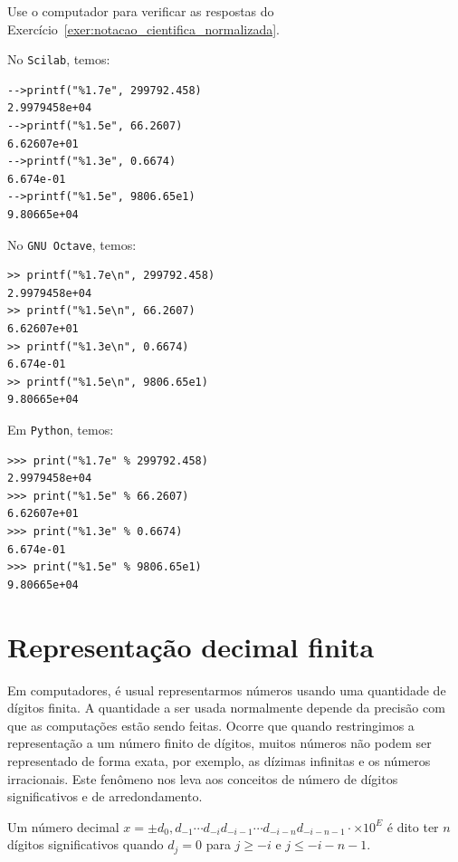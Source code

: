 \begin{exer}
  Use o computador para verificar as respostas do Exercício~\ref{exer:notacao_cientifica_normalizada}.
\end{exer}
\ifisscilab
\begin{resp}
No \verb+Scilab+, temos:
\begin{verbatim}
-->printf("%1.7e", 299792.458)
2.9979458e+04
-->printf("%1.5e", 66.2607)
6.62607e+01
-->printf("%1.3e", 0.6674)
6.674e-01
-->printf("%1.5e", 9806.65e1)
9.80665e+04
\end{verbatim}
\end{resp}
\fi
\ifisoctave
\begin{resp}
No \verb+GNU Octave+, temos:
\begin{verbatim}
>> printf("%1.7e\n", 299792.458)
2.9979458e+04
>> printf("%1.5e\n", 66.2607)
6.62607e+01
>> printf("%1.3e\n", 0.6674)
6.674e-01
>> printf("%1.5e\n", 9806.65e1)
9.80665e+04
\end{verbatim}
\end{resp}
\fi
\ifispython
\begin{resp}
Em \verb+Python+, temos:
\begin{verbatim}
>>> print("%1.7e" % 299792.458)
2.9979458e+04
>>> print("%1.5e" % 66.2607)
6.62607e+01
>>> print("%1.3e" % 0.6674)
6.674e-01
>>> print("%1.5e" % 9806.65e1)
9.80665e+04
\end{verbatim}
\end{resp}
\fi


\section{Representação decimal finita}

Em computadores, é usual representarmos números usando uma quantidade de dígitos finita. A quantidade a ser usada normalmente depende da precisão com que as computações estão sendo feitas. Ocorre que quando restringimos a representação a um número finito de dígitos, muitos números não podem ser representado de forma exata, por exemplo, as dízimas infinitas e os números irracionais. Este fenômeno nos leva aos conceitos de número de dígitos significativos e de arredondamento.

\begin{defn} Um número decimal $x = \pm d_0,d_{-1}\cdots d_{-i}d_{-i-1}\cdots d_{-i-n} d_{-i-n-1}\cdot \times 10^E$ é dito ter $n$ dígitos significativos quando $d_{j}=0$ para $j\geq -i$ e $j\leq-i-n-1$.
\end{defn}

